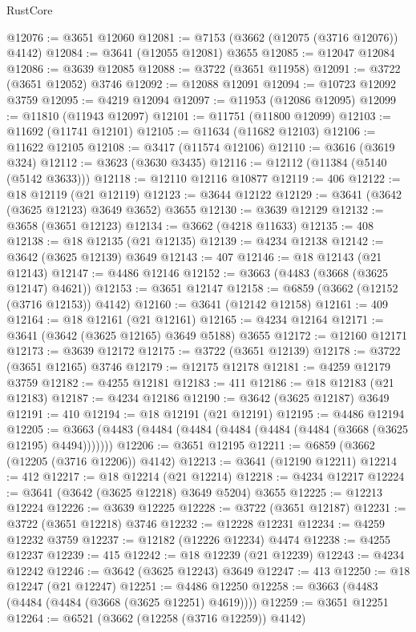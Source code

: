\begin{lexlean}{RustCore}
\begin{coremodule}
@12076 := @3651 @12060
@12081 := @7153 (@3662 (@12075 (@3716 @12076)) @4142)
@12084 := @3641 (@12055 @12081) @3655
@12085 := @12047 @12084
@12086 := @3639 @12085
@12088 := @3722 (@3651 @11958)
@12091 := @3722 (@3651 @12052) @3746
@12092 := @12088 @12091
@12094 := @10723 @12092 @3759
@12095 := @4219 @12094
@12097 := @11953 (@12086 @12095)
@12099 := @11810 (@11943 @12097)
@12101 := @11751 (@11800 @12099)
@12103 := @11692 (@11741 @12101)
@12105 := @11634 (@11682 @12103)
@12106 := @11622 @12105
@12108 := @3417 (@11574 @12106)
@12110 := @3616 (@3619 @324)
@12112 := @3623 (@3630 @3435)
@12116 := @12112 (@11384 (@5140 (@5142 @3633)))
@12118 := @12110 @12116 @10877
@12119 := 406
@12122 := @18 @12119 (@21 @12119)
@12123 := @3644 @12122
@12129 := @3641 (@3642 (@3625 @12123) @3649 @3652) @3655
@12130 := @3639 @12129
@12132 := @3658 (@3651 @12123)
@12134 := @3662 (@4218 @11633)
@12135 := 408
@12138 := @18 @12135 (@21 @12135)
@12139 := @4234 @12138
@12142 := @3642 (@3625 @12139) @3649
@12143 := 407
@12146 := @18 @12143 (@21 @12143)
@12147 := @4486 @12146
@12152 := @3663 (@4483 (@3668 (@3625 @12147) @4621))
@12153 := @3651 @12147
@12158 := @6859 (@3662 (@12152 (@3716 @12153)) @4142)
@12160 := @3641 (@12142 @12158)
@12161 := 409
@12164 := @18 @12161 (@21 @12161)
@12165 := @4234 @12164
@12171 := @3641 (@3642 (@3625 @12165) @3649 @5188) @3655
@12172 := @12160 @12171
@12173 := @3639 @12172
@12175 := @3722 (@3651 @12139)
@12178 := @3722 (@3651 @12165) @3746
@12179 := @12175 @12178
@12181 := @4259 @12179 @3759
@12182 := @4255 @12181
@12183 := 411
@12186 := @18 @12183 (@21 @12183)
@12187 := @4234 @12186
@12190 := @3642 (@3625 @12187) @3649
@12191 := 410
@12194 := @18 @12191 (@21 @12191)
@12195 := @4486 @12194
@12205 := @3663 (@4483 (@4484 (@4484 (@4484 (@4484 (@4484 (@3668 (@3625 @12195) @4494)))))))
@12206 := @3651 @12195
@12211 := @6859 (@3662 (@12205 (@3716 @12206)) @4142)
@12213 := @3641 (@12190 @12211)
@12214 := 412
@12217 := @18 @12214 (@21 @12214)
@12218 := @4234 @12217
@12224 := @3641 (@3642 (@3625 @12218) @3649 @5204) @3655
@12225 := @12213 @12224
@12226 := @3639 @12225
@12228 := @3722 (@3651 @12187)
@12231 := @3722 (@3651 @12218) @3746
@12232 := @12228 @12231
@12234 := @4259 @12232 @3759
@12237 := @12182 (@12226 @12234) @4474
@12238 := @4255 @12237
@12239 := 415
@12242 := @18 @12239 (@21 @12239)
@12243 := @4234 @12242
@12246 := @3642 (@3625 @12243) @3649
@12247 := 413
@12250 := @18 @12247 (@21 @12247)
@12251 := @4486 @12250
@12258 := @3663 (@4483 (@4484 (@4484 (@3668 (@3625 @12251) @4619))))
@12259 := @3651 @12251
@12264 := @6521 (@3662 (@12258 (@3716 @12259)) @4142)

\end{coremodule}
\end{lexlean}
